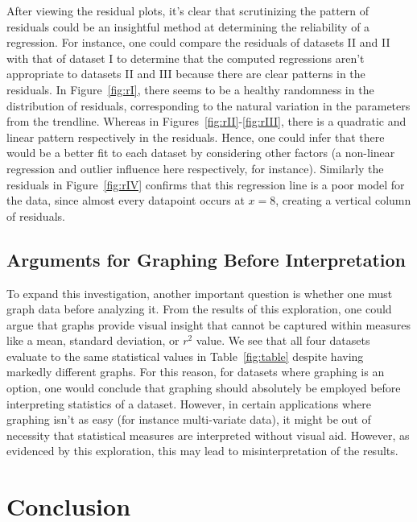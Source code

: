 \documentclass[11pt,a4paper]{article}
\begin{document}
\linebreak
After viewing the residual plots, it's clear that scrutinizing the pattern of residuals could be an insightful method at determining the reliability of a regression. For instance, one could compare the residuals of datasets II and II with that of dataset I to determine that the computed regressions aren't appropriate to datasets II and III because there are clear patterns in the residuals. In Figure~\ref{fig:rI}, there seems to be a healthy randomness in the distribution of residuals, corresponding to the natural variation in the parameters from the trendline. Whereas in Figures~\ref{fig:rII}-\ref{fig:rIII}, there is a quadratic and linear pattern respectively in the residuals. Hence, one could infer that there would be a better fit to each dataset by considering other factors (a non-linear regression and outlier influence here respectively, for instance). Similarly the residuals in Figure~\ref{fig:rIV} confirms that this regression line is a poor model for the data, since almost every datapoint occurs at $x = 8$, creating a vertical column of residuals.

\subsection{Arguments for Graphing Before Interpretation}

To expand this investigation, another important question is whether one must graph data before analyzing it. From the results of this exploration, one could argue that graphs provide visual insight that cannot be captured within measures like a mean, standard deviation, or $r^2$ value. We see that all four datasets evaluate to the same statistical values in Table~\ref{fig:table} despite having  markedly different graphs. For this reason, for datasets where graphing is an option, one would conclude that graphing should absolutely be employed before interpreting statistics of a dataset. However, in certain applications where graphing isn't as easy (for instance multi-variate data), it might be out of necessity that statistical measures are interpreted without visual aid. However, as evidenced by this exploration, this may lead to misinterpretation of the results.

\section{Conclusion}
\end{document}
